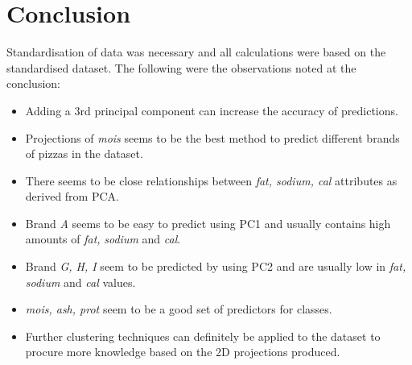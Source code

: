 \documentclass[preprint,12pt]{elsarticle}
\begin{document}
\section{Conclusion}
\label{s:Conclusion}
Standardisation of data was necessary and all calculations were based on the standardised dataset.
The following were the observations noted at the conclusion:
\begin{itemize}
\item Adding a 3rd principal component can increase the accuracy of predictions.
\item Projections of \textit{mois} seems to be the best method to predict different brands of pizzas in the dataset.
\item There seems to be close relationships between \textit{fat, sodium, cal } attributes as derived from PCA.
\item Brand \textit{A} seems to be easy to predict using PC1 and usually contains high amounts of \textit{fat, } \textit{sodium }and \textit{cal}.
\item Brand \textit{G, H, I} seem to be predicted by using PC2 and are usually low in \textit{fat, sodium }and \textit{cal} values.
\item \textit{mois, ash, prot} seem to be a good set of predictors for classes.
\item Further clustering techniques can definitely be applied to the dataset to procure more knowledge based on the 2D projections produced.
\end{itemize}





%

\end{document}
